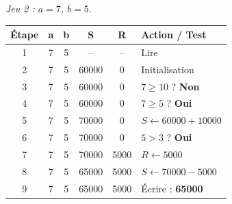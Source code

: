 \documentclass[11pt]{article}
\begin{document}
\begin{corrige}
\begin{enumerate}
\emph{Jeu 2 : $a = 7$, $b = 5$.}
\begin{center}
\begin{tabularx}{\linewidth}{|c|c|c|c|c|X|}
\hline
\rowcolor{popblueL} \textbf{Étape} & \textbf{a} & \textbf{b} & \textbf{S} & \textbf{R} & \textbf{Action / Test} \\
\hline
1 & 7 & 5 & -- & -- & Lire \\
2 & 7 & 5 & 60000 & 0 & Initialisation \\
3 & 7 & 5 & 60000 & 0 & $7 \geq 10$ ? \textbf{Non} \\
4 & 7 & 5 & 60000 & 0 & $7 \geq 5$ ? \textbf{Oui} \\
5 & 7 & 5 & 70000 & 0 & $S \leftarrow 60000 + 10000$ \\
6 & 7 & 5 & 70000 & 0 & $5 > 3$ ? \textbf{Oui} \\
7 & 7 & 5 & 70000 & 5000 & $R \leftarrow 5000$ \\
8 & 7 & 5 & 65000 & 5000 & $S \leftarrow 70000 - 5000$ \\
9 & 7 & 5 & 65000 & 5000 & Écrire : \textbf{65000} \\
\hline
\end{tabularx}
\end{center}


\end{enumerate}
\end{corrige}
\end{document}
